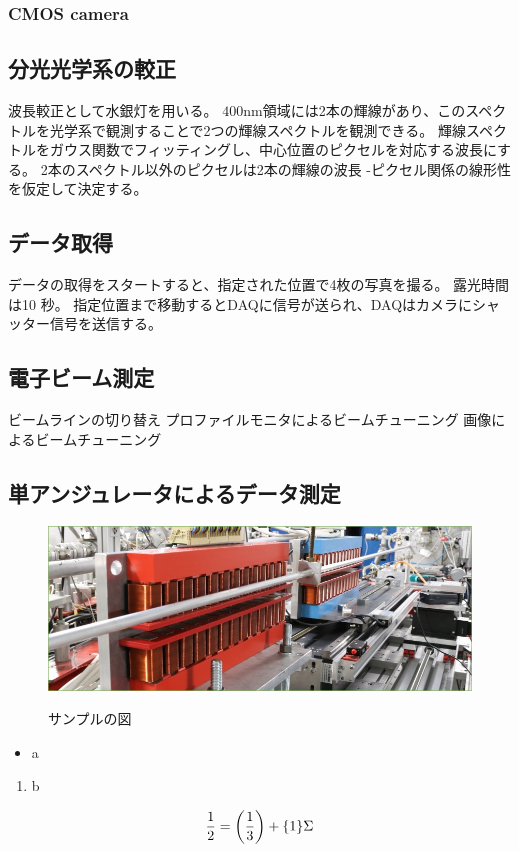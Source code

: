 \documentclass[a4paper,11pt,uplatex]{jsarticle}
\begin{document}
\subsubsection{CMOS camera}

\subsection{分光光学系の較正}
波長較正として水銀灯を用いる。
$400 \text{nm}$領域には2本の輝線があり、このスペクトルを光学系で観測することで2つの輝線スペクトルを観測できる。
輝線スペクトルをガウス関数でフィッティングし、中心位置のピクセルを対応する波長にする。
2本のスペクトル以外のピクセルは2本の輝線の波長 -ピクセル関係の線形性を仮定して決定する。

\subsection{データ取得}
データの取得をスタートすると、指定された位置で4枚の写真を撮る。
露光時間は10 秒。
指定位置まで移動するとDAQに信号が送られ、DAQはカメラにシャッター信号を送信する。

\subsection{電子ビーム測定}

ビームラインの切り替え
プロファイルモニタによるビームチューニング
画像によるビームチューニング

\subsection{単アンジュレータによるデータ測定}

\clearpage

\begin{figure}[tb]
  \centering
  \includegraphics[width=0.8\linewidth]{image/1-1.jpg}\\
  \caption{サンプルの図}
  \label{sample_image}
\end{figure}

\begin{itemize}
  \item a
\end{itemize}
\begin{enumerate}
  \item b
\end{enumerate}

\begin{align}
\frac{1}{2} = \qty(\frac{1}{3}) + \qty{1}\Sigma
\end{align}
\end{document}
